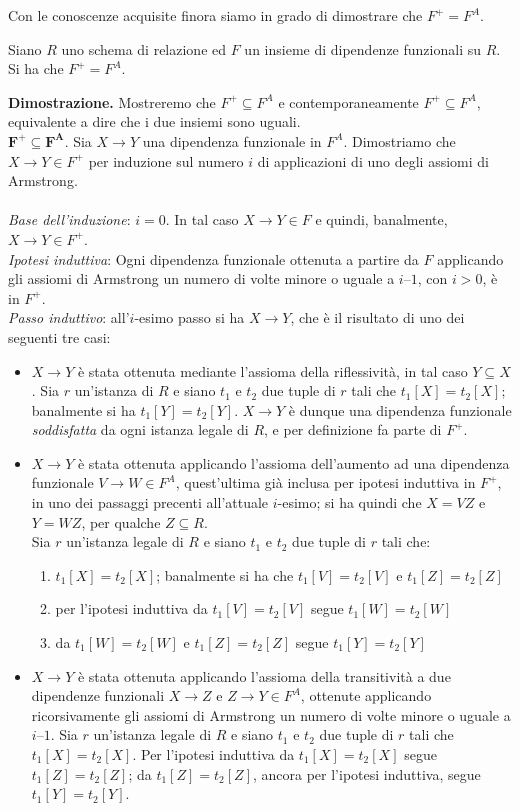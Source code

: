 Con le conoscenze acquisite finora siamo in grado di dimostrare che $F^+ = F^A$.
\label{teorema4_3}
\begin{theo}
Siano $R$ uno schema di relazione ed $F$ un insieme di dipendenze funzionali su $R$. Si ha che $F^+ = F^A$.
\end{theo}
\textbf{Dimostrazione.} Mostreremo che $F^+ \subseteq F^A$ e contemporaneamente $F^+ \subseteq F^A$, equivalente
a dire che i due insiemi sono uguali.\\
$\mathbf{F^{\boldsymbol{+}} \boldsymbol{\subseteq} F^A}$. Sia $X \rightarrow Y$ una dipendenza funzionale in $F^A$.
Dimostriamo che $X\rightarrow Y \in F^+$ per induzione sul numero $i$ di applicazioni di uno degli assiomi di Armstrong.\\\\
\emph{Base dell'induzione}: $i=0$. In tal caso $X \rightarrow Y \in F$ e quindi, banalmente, 
$X \rightarrow Y \in F^+$.\\
\emph{Ipotesi induttiva}: Ogni dipendenza funzionale ottenuta a partire da $F$ applicando gli assiomi di 
Armstrong un numero di volte minore o uguale a $i–1$, con $i>0$, è in $F^+$.\\
\emph{Passo induttivo}: all'$i$-esimo passo si ha $X \rightarrow Y$, che è il risultato di uno dei seguenti 
tre casi:
\begin{itemize}
 \item  $X \rightarrow Y$ è stata ottenuta mediante l'assioma della riflessività, in tal caso $Y \subseteq X$. 
 Sia $r$ un'istanza di $R$ e siano $t_1$ e $t_2$ due tuple di $r$ tali che $t_1[X]=t_2[X]$; banalmente si ha 
 $t_1[Y] = t_2[Y]$. $X \rightarrow Y$ è dunque una dipendenza funzionale \emph{soddisfatta} da ogni istanza legale
 di $R$, e per definizione fa parte di $F^+$.
 \item $X \rightarrow Y$ è stata ottenuta applicando l'assioma dell'aumento ad una dipendenza funzionale 
 $V \rightarrow W \in F^A$, quest'ultima già inclusa per ipotesi induttiva in $F^+$, in uno dei passaggi 
 precenti all'attuale $i$-esimo; si ha quindi che $X = VZ$ e $Y = WZ$, per qualche $Z \subseteq R$.\\
 Sia $r$ un'istanza legale di $R$ e siano $t_1$ e $t_2$ due tuple di $r$ tali che:
 \begin{enumerate}
  \item $t_1[X] = t_2[X]$; banalmente si ha che $t_1[V] = t_2[V]$ e $t_1[Z] = t_2[Z]$
  \item per l'ipotesi induttiva da $t_1[V] = t_2[V]$ segue $t_1[W] = t_2[W]$
  \item da $t_1[W] = t_2[W]$ e $t_1[Z] = t_2[Z]$ segue $t_1[Y] = t_2[Y]$
 \end{enumerate}
\item $X \rightarrow Y$ è stata ottenuta applicando l'assioma della transitività a due dipendenze funzionali 
$X \rightarrow Z$ e $Z \rightarrow Y \in F^A$, ottenute applicando ricorsivamente gli assiomi di Armstrong 
un numero di volte minore o uguale a $i–1$. Sia $r$ un'istanza legale di $R$ e siano $t_1$ e $t_2$ due tuple 
di $r$ tali che $t_1[X] = t_2[X]$. Per l'ipotesi induttiva da $t_1[X] = t_2[X]$ segue $t_1[Z] = t_2[Z]$; da 
$t_1[Z] = t_2[Z]$, ancora per l'ipotesi induttiva, segue $t_1[Y] = t_2[Y]$.
\end{itemize}

